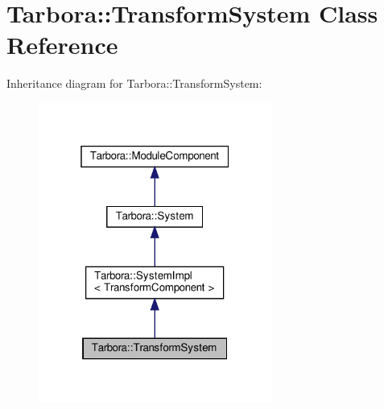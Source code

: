\hypertarget{classTarbora_1_1TransformSystem}{}\section{Tarbora\+:\+:Transform\+System Class Reference}
\label{classTarbora_1_1TransformSystem}


Inheritance diagram for Tarbora\+:\+:Transform\+System\+:\nopagebreak
\begin{figure}[H]
\begin{center}
\leavevmode
\includegraphics[width=217pt]{classTarbora_1_1TransformSystem__inherit__graph}
\end{center}
\end{figure}


